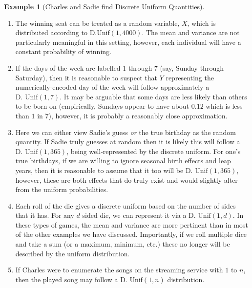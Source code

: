 \documentclass[
  letterpaper,
  DIV=11,
  numbers=noendperiod]{scrreprt}
\providecommand{\tightlist}{%
  \setlength{\itemsep}{0pt}\setlength{\parskip}{0pt}}\usepackage{longtable,booktabs,array}
\theoremstyle{definition}
\theoremstyle{definition}
\newtheorem{example}{Example}[chapter]
\theoremstyle{definition}
\theoremstyle{remark}
\begin{document}
\begin{example}[Charles and Sadie find Discrete Uniform
Quantities]
\begin{tcolorbox}[enhanced jigsaw, colback=white, colframe=quarto-callout-color-frame, arc=.35mm, leftrule=.75mm, rightrule=.15mm, opacityback=0, breakable, bottomrule=.15mm, left=2mm, toprule=.15mm]
\begin{enumerate}
\def\labelenumi{\alph{enumi}.}
\tightlist
\item
  The winning seat can be treated as a random variable, \(X\), which is
  distributed according to \(\text{D.Unif}(1, 4000)\). The mean and
  variance are not particularly meaningful in this setting, however,
  each individual will have a constant probability of winning.
\item
  If the days of the week are labelled \(1\) through \(7\) (say, Sunday
  through Saturday), then it is reasonable to suspect that \(Y\)
  representing the numerically-encoded day of the week will follow
  approximately a \(\text{D. Unif}(1,7)\). It may be arguable that some
  days are less likely than others to be born on (empirically, Sundays
  appear to have about \(0.12\) which is less than \(1\) in \(7\)),
  however, it is probably a reasonably close approximation.
\item
  Here we can either view Sadie's guess \emph{or} the true birthday as
  the random quantity. If Sadie truly guesses at random then it is
  likely this will follow a \(\text{D. Unif}(1, 365)\), being
  well-represented by the discrete uniform. For one's true birthdays, if
  we are willing to ignore seasonal birth effects and leap years, then
  it is reasonable to assume that it too will be
  \(\text{D. Unif}(1,365)\), however, these are both effects that do
  truly exist and would slightly alter from the uniform probabilities.
\item
  Each roll of the die gives a discrete uniform based on the number of
  sides that it has. For any \(d\) sided die, we can represent it via a
  \(\text{D. Unif}(1,d)\). In these types of games, the mean and
  variance are more pertinent than in most of the other examples we have
  discussed. Importantly, if we roll multiple dice and take a sum (or a
  maximum, minimum, etc.) these no longer will be described by the
  uniform distribution.
\item
  If Charles were to enumerate the songs on the streaming service with
  \(1\) to \(n\), then the played song may follow a
  \(\text{D. Unif}(1, n)\) distribution.\footnotemark{}
\end{enumerate}

\end{tcolorbox}


\end{example}
\end{document}
